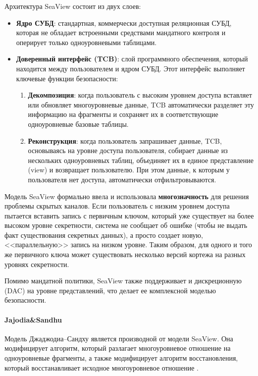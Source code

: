 Архитектура SeaView состоит из двух слоев:
\begin{itemize}
    \item \textbf{Ядро СУБД}: стандартная, коммерчески доступная реляционная СУБД, которая не обладает встроенными средствами мандатного контроля и оперирует только одноуровневыми таблицами.
    \item \textbf{Доверенный интерфейс (TCB)}: слой программного обеспечения, который находится между пользователем и ядром СУБД. Этот интерфейс выполняет ключевые функции безопасности:
    \begin{enumerate}
        \item \textbf{Декомпозиция}: когда пользователь с высоким уровнем доступа вставляет или обновляет многоуровневые данные, TCB автоматически разделяет эту информацию на фрагменты и сохраняет их в соответствующие одноуровневые базовые таблицы.
        \item \textbf{Реконструкция}: когда пользователь запрашивает данные, TCB, основываясь на уровне доступа пользователя, собирает данные из нескольких одноуровневых таблиц, объединяет их в единое представление (view) и возвращает пользователю. При этом данные, к которым у пользователя нет доступа, автоматически отфильтровываются.
    \end{enumerate}
\end{itemize}

Модель SeaView формально ввела и использовала \textbf{многозначность} для решения проблемы скрытых каналов. Если пользователь с низким уровнем доступа пытается вставить запись с первичным ключом, который уже существует на более высоком уровне секретности, система не сообщает об ошибке (чтобы не выдать факт существования секретных данных), а просто создает новую, <<параллельную>> запись на низком уровне. Таким образом, для одного и того же первичного ключа может существовать несколько версий кортежа на разных уровнях секретности.

Помимо мандатной политики, SeaView также поддерживает и дискреционную (DAC) на уровне представлений, что делает ее комплексной моделью безопасности.

\paragraph{Jajodia\&Sandhu}

Модель Джаджодиа–Сандху является производной от модели SeaView. Она модифицирует алгоритм, который разлагает
многоуровневое отношение на одноуровневые фрагменты, а также модифицирует алгоритм восстановления, который
восстанавливает исходное многоуровневое отношение \autocite{Osama}.

